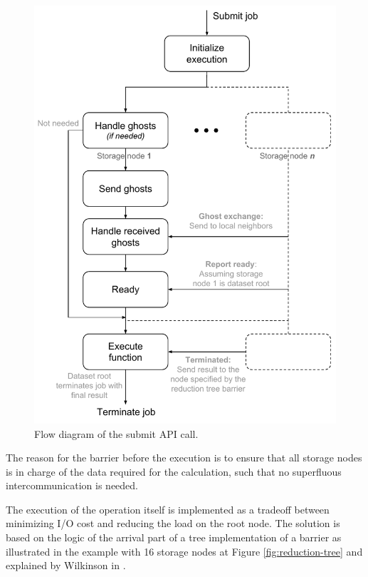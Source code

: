 \begin{figure}
	\centering
	\includegraphics[scale=0.7]{pdf/submit-job.pdf}
	\caption{Flow diagram of the submit API call. \label{fig:submit-job}}
\end{figure}	

\noindent
The reason for the barrier before the execution is to ensure that all storage nodes is in charge of the data required for the calculation, such that no superfluous intercommunication is needed.
\newline

The execution of the operation itself is implemented as a tradeoff between minimizing I/O cost and reducing the load on the root node. The solution is based on the logic of the arrival part of a tree implementation of a barrier as illustrated in the example with 16 storage nodes at Figure \ref{fig:reduction-tree} and explained by Wilkinson \etal in \cite{Wilkinson:1998:PPT:289352}.

